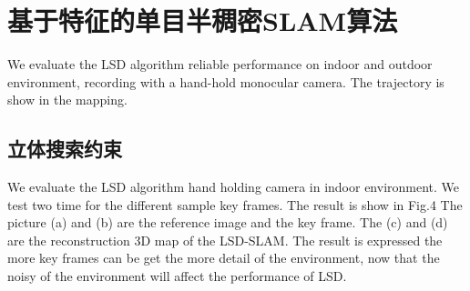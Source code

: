 
\chapter{基于特征的单目半稠密SLAM算法}
\label{chap:Semi-Dense}
We evaluate the LSD algorithm reliable performance on indoor and outdoor environment, recording with a hand-hold monocular camera. The trajectory is show in the mapping.

\section{立体搜索约束}
We evaluate the LSD algorithm hand holding camera in indoor environment. We test two time for the different sample key frames. The result is show in Fig.4 The picture (a) and (b) are the reference image and the key frame. The (c) and (d) are the reconstruction 3D map of the LSD-SLAM. The result is expressed the more key frames can be get the more detail of the environment, now that the noisy of the environment will affect the performance of LSD.

